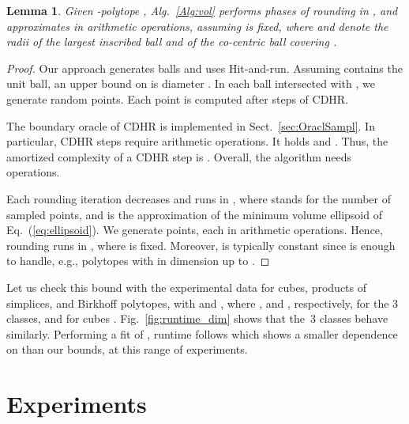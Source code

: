 \documentclass[11pt,a4paper]{article}
\newtheorem{lemma}[theorem]{\noindent Lemma}
\begin{document}
\begin{lemma}
Given -polytope , Alg.~\ref{Alg:vol}
performs  phases of rounding in , and approximates 
in  arithmetic operations,
assuming  is fixed,
where  and  denote the radii of the largest inscribed ball and
of the co-centric ball covering .
\end{lemma}
\begin{proof}
Our approach generates  balls and uses Hit-and-run.
Assuming  contains the unit ball, an upper bound on 
is diameter . 
In each ball intersected with , we generate
 random points.
Each point is computed after  steps of CDHR.

The boundary oracle of CDHR is implemented in Sect.~\ref{sec:OraclSampl}.
In particular,  CDHR steps require  arithmetic operations. 
It holds  and .
Thus, the amortized complexity of a CDHR step is .
Overall, the algorithm needs
 operations.

Each rounding iteration decreases  and runs in
, where  stands for the number
of sampled points, and  is the approximation of
the minimum volume ellipsoid of Eq.~(\ref{eq:ellipsoid}).
We generate  points, each in  arithmetic operations.
Hence, rounding runs in , where  is fixed.
Moreover,  is typically constant since  is enough to handle,
e.g., polytopes with  in dimension up to . 
\end{proof}

Let us check this bound with the
experimental data for cubes, products of simplices, and Birkhoff polytopes,
with  and , where
,  and , respectively, for the 3 classes, 
and for cubes .  
Fig.~\ref{fig:runtime_dim} shows that the~3 classes behave similarly.
Performing a fit of , runtime follows 
which shows a smaller dependence on  than our bounds,
at this range of experiments.


\section{Experiments}\label{sec:exper}
\end{document}
